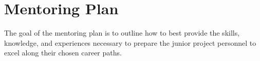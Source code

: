 \section*{\hfil Mentoring Plan \hfil}
\vspace{-16pt}
\noindent\hrulefill

\noindent The goal of the mentoring plan is to outline how to best provide the skills, knowledge, and experiences necessary to prepare the junior project personnel to excel along their chosen career paths. 